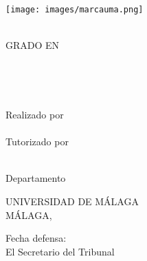 \begin{center}
    \begin{figure*}[h]
        \centering
        \texttt{[image: images/marcauma.png]}
    \end{figure*}

    \MakeUppercase{\facultad} \\
    GRADO EN \MakeUppercase{\grado} \\
    \vspace{3cm}

    {\large	\tituloes} \\
    \ifdef{\subtituloes}{
        \textit{\subtituloes} \\
    }{}
    \bigbreak

    {\large	\tituloen} \\
    \ifdef{\subtituloen}{
        \textit{\subtituloen} \\
    }{}
    \bigbreak

    Realizado por \\
    \textbf{\alumno} \\

    Tutorizado por \\
    \textbf{\tutor} \\

    Departamento \\
    \textbf{\departamento}
    \bigbreak

    UNIVERSIDAD DE MÁLAGA \\
    MÁLAGA, \MakeUppercase{\fecha}
\end{center}

\vfill

Fecha defensa: \\
El Secretario del Tribunal
